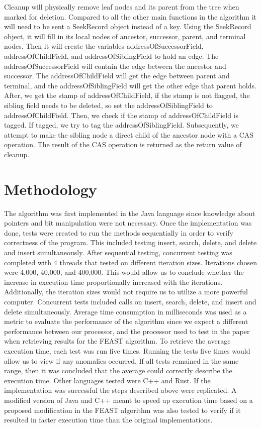 \documentclass[conference]{IEEEtran}
\begin{document}
Cleanup will physically remove leaf nodes and its parent from the tree when marked for deletion. Compared to all the other main functions in the algorithm it will need to be sent a SeekRecord object instead of a key. Using the SeekRecord object, it will fill in its local nodes of ancestor, successor, parent, and terminal nodes. Then it will create the variables addressOfSuccessorField, addressOfChildField, and addressOfSiblingField to hold an edge. The addressOfSuccessorField will contain the edge between the ancestor and successor. The addressOfChildField will get the edge between parent and terminal, and the addressOfSiblingField will get the other edge that parent holds. After, we get the stamp of addressOfChildField, if the stamp is not flagged, the sibling field needs to be deleted, so set the addressOfSiblingField to addressOfChildField. Then, we check if the stamp of addressOfChildField is tagged. If tagged, we try to tag the addressOfSiblingField. Subsequently, we attempt to make the sibling node a direct child of the ancestor node with a CAS operation. The result of the CAS operation is returned as the return value of cleanup.

\section{Methodology}
The algorithm was first implemented in the Java language since knowledge about pointers and bit manipulation were not necessary. Once the implementation was done, tests were created to run the methods sequentially in order to verify correctness of the program. This included testing insert, search, delete, and delete and insert simultaneously. After sequential testing, concurrent testing was completed with 4 threads that tested on different iteration sizes. Iterations chosen were 4,000, 40,000, and 400,000. This would allow us to conclude whether the increase in execution time proportionally increased with the iterations. Additionally, the iteration sizes would not require us to utilize a more powerful computer. Concurrent tests included calls on insert, search, delete, and insert and delete simultaneously. Average time consumption in milliseconds was used as a metric to evaluate the performance of the algorithm since we expect a different performance between our processor, and the processor used to test in the paper when retrieving results for the FEAST algorithm. To retrieve the average execution time, each test was run five times. Running the tests five times would allow us to view if any anomalies occurred. If all tests remained in the same range, then it was concluded that the average could correctly describe the execution time.
Other languages tested were C++ and Rust. If the implementation was successful the steps described above were replicated. 
A modified version of Java and C++ meant to speed up execution time based on a proposed modification in the FEAST algorithm was also tested to verify if it resulted in faster execution time than the original implementations.
\end{document}
